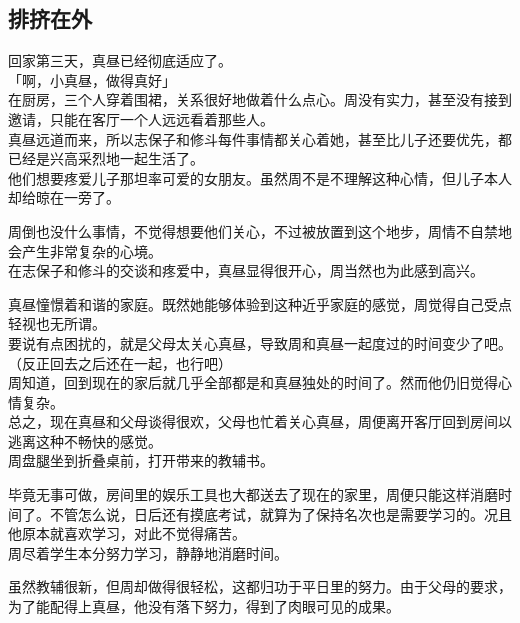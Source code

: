 \subsection{排挤在外}

回家第三天，真昼已经彻底适应了。\\

「啊，小真昼，做得真好」\\

在厨房，三个人穿着围裙，关系很好地做着什么点心。周没有实力，甚至没有接到邀请，只能在客厅一个人远远看着那些人。\\

真昼远道而来，所以志保子和修斗每件事情都关心着她，甚至比儿子还要优先，都已经是兴高采烈地一起生活了。\\

他们想要疼爱儿子那坦率可爱的女朋友。虽然周不是不理解这种心情，但儿子本人却给晾在一旁了。

周倒也没什么事情，不觉得想要他们关心，不过被放置到这个地步，周情不自禁地会产生非常复杂的心境。\\

在志保子和修斗的交谈和疼爱中，真昼显得很开心，周当然也为此感到高兴。

真昼憧憬着和谐的家庭。既然她能够体验到这种近乎家庭的感觉，周觉得自己受点轻视也无所谓。\\

要说有点困扰的，就是父母太关心真昼，导致周和真昼一起度过的时间变少了吧。\\

（反正回去之后还在一起，也行吧）\\

周知道，回到现在的家后就几乎全部都是和真昼独处的时间了。然而他仍旧觉得心情复杂。\\

总之，现在真昼和父母谈得很欢，父母也忙着关心真昼，周便离开客厅回到房间以逃离这种不畅快的感觉。\\

周盘腿坐到折叠桌前，打开带来的教辅书。

毕竟无事可做，房间里的娱乐工具也大都送去了现在的家里，周便只能这样消磨时间了。不管怎么说，日后还有摸底考试，就算为了保持名次也是需要学习的。况且他原本就喜欢学习，对此不觉得痛苦。\\

周尽着学生本分努力学习，静静地消磨时间。

虽然教辅很新，但周却做得很轻松，这都归功于平日里的努力。由于父母的要求，为了能配得上真昼，他没有落下努力，得到了肉眼可见的成果。\\

